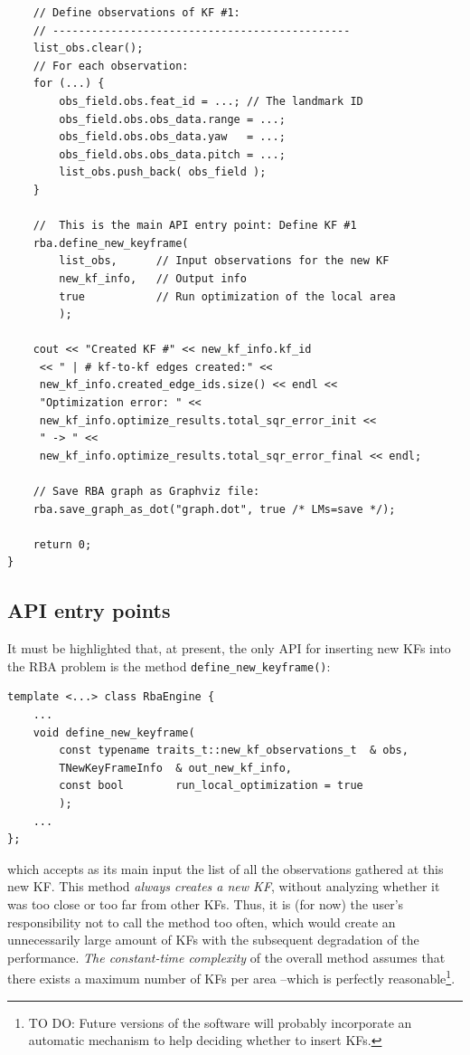 \documentclass[a4paper,11pt]{article}
\begin{document}
\begin{lstlisting}
	// Define observations of KF #1:
	// ----------------------------------------------
	list_obs.clear();
	// For each observation:
	for (...) {
		obs_field.obs.feat_id = ...; // The landmark ID
		obs_field.obs.obs_data.range = ...;
		obs_field.obs.obs_data.yaw   = ...;
		obs_field.obs.obs_data.pitch = ...;
		list_obs.push_back( obs_field );
	}

	//  This is the main API entry point: Define KF #1
	rba.define_new_keyframe(
		list_obs,      // Input observations for the new KF
		new_kf_info,   // Output info
		true           // Run optimization of the local area
		);

	cout << "Created KF #" << new_kf_info.kf_id 
	 << " | # kf-to-kf edges created:" <<  
	 new_kf_info.created_edge_ids.size() << endl <<
	 "Optimization error: " << 
	 new_kf_info.optimize_results.total_sqr_error_init << 
	 " -> " << 
	 new_kf_info.optimize_results.total_sqr_error_final << endl;

	// Save RBA graph as Graphviz file:
	rba.save_graph_as_dot("graph.dot", true /* LMs=save */);

	return 0;
}
\end{lstlisting}

\newpage

\subsection{API entry points}

It must be highlighted that, at present, the only API for inserting new KFs 
into the RBA problem is the method \texttt{define\_new\_keyframe()}:

\begin{lstlisting}
template <...> class RbaEngine {
    ...
	void define_new_keyframe(
		const typename traits_t::new_kf_observations_t  & obs,
		TNewKeyFrameInfo  & out_new_kf_info,
		const bool        run_local_optimization = true
		);
    ...
};
\end{lstlisting}

\noindent which accepts as its main input the list of all the observations gathered at this 
new KF. This method \emph{always creates a new KF}, without analyzing whether it was 
too close or too far from other KFs. Thus, it is (for now) the user's responsibility 
not to call the method too often, which would create an unnecessarily large amount of KFs with 
the subsequent degradation of the performance. \emph{The constant-time complexity} of the overall 
method assumes that there exists a maximum number of KFs per area --which is perfectly reasonable\footnote{TO DO: Future
versions of the software will probably incorporate an automatic mechanism to help deciding whether to insert
KFs.}.
\end{document}
